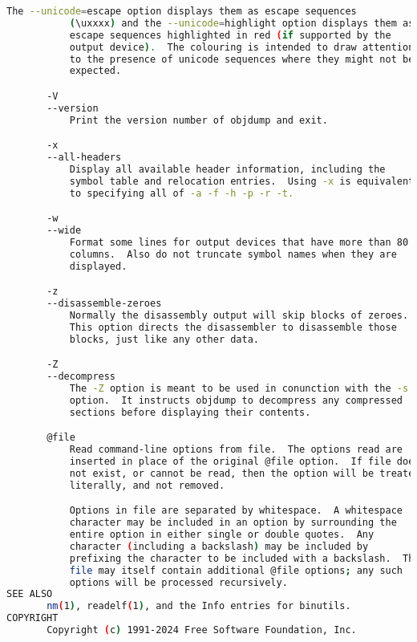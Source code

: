 {{\begin{lstlisting}[language=bash]
           The --unicode=escape option displays them as escape sequences
           (\uxxxx) and the --unicode=highlight option displays them as
           escape sequences highlighted in red (if supported by the
           output device).  The colouring is intended to draw attention
           to the presence of unicode sequences where they might not be
           expected.

       -V
       --version
           Print the version number of objdump and exit.

       -x
       --all-headers
           Display all available header information, including the
           symbol table and relocation entries.  Using -x is equivalent
           to specifying all of -a -f -h -p -r -t.

       -w
       --wide
           Format some lines for output devices that have more than 80
           columns.  Also do not truncate symbol names when they are
           displayed.

       -z
       --disassemble-zeroes
           Normally the disassembly output will skip blocks of zeroes.
           This option directs the disassembler to disassemble those
           blocks, just like any other data.

       -Z
       --decompress
           The -Z option is meant to be used in conunction with the -s
           option.  It instructs objdump to decompress any compressed
           sections before displaying their contents.

       @file
           Read command-line options from file.  The options read are
           inserted in place of the original @file option.  If file does
           not exist, or cannot be read, then the option will be treated
           literally, and not removed.

           Options in file are separated by whitespace.  A whitespace
           character may be included in an option by surrounding the
           entire option in either single or double quotes.  Any
           character (including a backslash) may be included by
           prefixing the character to be included with a backslash.  The
           file may itself contain additional @file options; any such
           options will be processed recursively.
SEE ALSO
       nm(1), readelf(1), and the Info entries for binutils.
COPYRIGHT
       Copyright (c) 1991-2024 Free Software Foundation, Inc.


\end{lstlisting}}}
